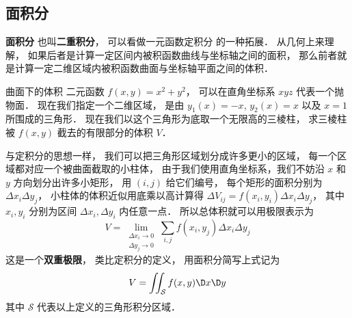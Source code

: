 
\subsection{面积分}
\textbf{面积分} 也叫\textbf{二重积分}， 可以看做一元函数定积分 的一种拓展． 从几何上来理解， 如果后者是计算一定区间内被积函数曲线与坐标轴之间的面积， 那么前者就是计算一定二维区域内被积函数曲面与坐标轴平面之间的体积．

\begin{exam}{曲面下的体积}
二元函数 $f(x,y) = x^2 + y^2$， 可以在直角坐标系 $xyz$ 代表一个抛物面． 现在我们指定一个二维区域， 是由 $y_1(x) = -x$, $y_2(x) = x$ 以及 $x = 1$ 所围成的三角形． 现在我们以这个三角形为底取一个无限高的三棱柱， 求三棱柱被 $f(x,y)$ 截去的有限部分的体积 $V$．

与定积分的思想一样， 我们可以把三角形区域划分成许多更小的区域， 每一个区域都对应一个被曲面截取的小柱体， 由于我们使用直角坐标系，我们不妨沿 $x$ 和 $y$ 方向划分出许多小矩形， 用 $(i,j)$ 给它们编号， 每个矩形的面积分别为 $\Delta x_i \Delta y_j$， 小柱体的体积近似用底乘以高计算得 $\Delta V_{ij} = f(x_i,y_i) \Delta x_i \Delta y_j$， 其中 $x_i, y_i$ 分别为区间 $\Delta x_i, \Delta y_i$ 内任意一点． 所以总体积就可以用极限表示为
\begin{equation}\label{IntN_eq1}
V = \lim_{\substack{\Delta x_i\to 0\\ \Delta y_j\to 0}} \sum_{i, j} f(x_i,y_j) \Delta x_i \Delta y_j
\end{equation}
这是一个\textbf{双重极限}， 类比定积分的定义， 用面积分简写上式记为
\begin{equation}
V = \iint_{\mathcal{S}} f(x,y) \D x\D y
\end{equation}
其中 $\mathcal{S}$ 代表以上定义的三角形积分区域． 


\end{exam}
